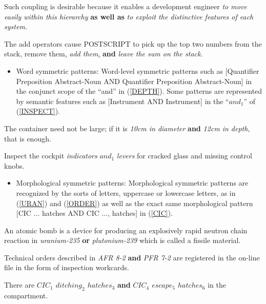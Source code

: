   \mylistin
    \item Such coupling is desirable because it enables a development
    engineer {\sl to move easily within this hierarchy} {\bf as well as}
    {\sl to exploit the distinctive features of each system}.
  \label{ASWELLAS}
  \item The add operators cause POSTSCRIPT to pick up
          the top two numbers from the stack\underline{,} remove
          them\underline{,} {\sl add
          them}\underline{,} 
          {\bf and} {\sl leave the sum on the stack}.
          \label{PS}
  \mylistend
  \begin{itemize}
    \item Word symmetric patterns:
       Word-level symmetric patterns such as [Quantifier
       Preposition Abstract-Noun AND Quantifier Preposition
       Abstract-Noun] in the conjunct scope of the ``and'' in
       (\ref{DEPTH}).
       Some patterns are represented by semantic features such as 
       [Instrument AND Instrument] in the ``$and_{1}$'' of
       (\ref{INSPECT}). 
  \end{itemize}
  \mylistin
  \item  The container need not be large; if it is {\sl 10cm in
           diameter} {\bf and} {\sl 12cm in depth}, that is enough.
          \label{DEPTH}
  \item
    Inspect the cockpit {\sl indicators}  {\bf $and_{1}$} {\sl levers}
    for cracked glass and missing control knobs.  
          \label{INSPECT}
  \mylistend
  \begin{itemize}
    \item Morphological symmetric patterns:
    Morphological symmetric patterns are recognized by the sorts of
    letters, uppercase or lowercase letters, as in (\ref{URAN}) and
(\ref{ORDER}) as well as the exact same morphological pattern [CIC ...
    hatches AND CIC ..., hatches] in (\ref{CIC}).  
  \end{itemize}
  \mylistin
  \item An atomic bomb is a device for producing an explosively
          rapid neutron chain reaction in {\sl uranium-235} {\bf or} {\sl
          plutonium-239} which is called a fissile material.
    \label{URAN}
  \item  Technical orders described in {\sl AFR 8-2} {\bf and} {\sl PFR
           7-2} are registered in the on-line file in the form of inspection
           workcards.  \label{ORDER} 
  \item  There are {\sl $CIC_{1}$ $ditching_{2}$ $hatches_{3}$} {\bf
         and} {\sl $CIC_{4}$ $escape_{5}$ $hatches_{6}$}
         in the compartment. \label{CIC}
  \mylistend

